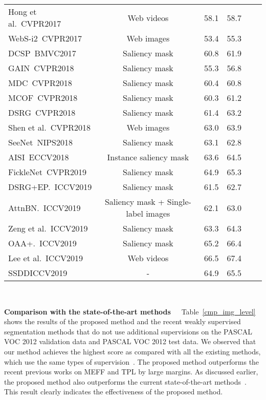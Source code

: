 \documentclass[10pt,twocolumn,letterpaper]{article}
\begin{document}
\begin{table}[tb]
\begin{center}
{\begin{tabular}{l|c|c|ccc}
       Hong et al.~\cite{webvideo-seg}\tiny{CVPR2017}  & Web videos  &  58.1   &   58.7\\
       WebS-i2~\cite{cvpr17web}\tiny{CVPR2017}      & Web images & 53.4 &55.3 \\
       DCSP~\cite{dcsp}\tiny{BMVC2017}      & Saliency mask & 60.8 &61.9 \\
       GAIN~\cite{gain}\tiny{CVPR2018}     & Saliency mask & 55.3 &56.8 \\
       MDC~\cite{mdc}\tiny{CVPR2018}      & Saliency mask & 60.4 & 60.8 \\
       MCOF~\cite{mcof}\tiny{CVPR2018}    & Saliency mask & 60.3 &61.2 \\
       DSRG~\cite{dsrg}\tiny{CVPR2018}   & Saliency mask & 61.4 &63.2 \\
       Shen et al.~\cite{cvpr18web}\tiny{CVPR2018}   & Web images  &  63.0 & 63.9 \\
       SeeNet~\cite{seenet}\tiny{NIPS2018}    & Saliency mask & 63.1 &62.8 \\
       AISI~\cite{salins}\tiny{ECCV2018}      & Instance saliency mask & 63.6 &64.5 \\
       FickleNet~\cite{ficklenet}\tiny{CVPR2019} & Saliency mask & 64.9 & 65.3 \\ 
       DSRG+EP.~\cite{DSRGEP}\tiny{ICCV2019} & Saliency mask & 61.5 & 62.7 \\ 
       AttnBN.~\cite{AttnBN}\tiny{ICCV2019} & Saliency mask + Single-label images & 62.1 & 63.0 \\
       Zeng et al.~\cite{zeng_iccv2019}\tiny{ICCV2019} & Saliency mask & 63.3 & 64.3 \\ 
       OAA+.~\cite{OAA}\tiny{ICCV2019} & Saliency mask & 65.2 & 66.4 \\ 
       Lee et al.~\cite{lee_iccv2019}\tiny{ICCV2019} & Web videos & 66.5 & 67.4 \\ \hline
       SSDD\tiny{ICCV2019}    & - &  64.9 &  65.5 \\
  \end{tabular}
}
\vskip -8mm~
  \end{center}
\end{table}


\noindent
{\bf Comparison with the state-of-the-art methods~~}
Table~\ref{cmp_img_level} shows the results of the proposed method and the recent weakly supervised segmentation methods that do not use additional supervisions on the PASCAL VOC 2012 validation data and PASCAL VOC 2012 test data.
We observed that our method achieves the highest score as compared with all the existing methods, 
which use the same types of supervision~\cite{Pathak15,papa15,dcsm,bfb,sec,tphase,cbts,meff,psa}.
The proposed method outperforms the recent previous works on MEFF and TPL by large margins.
As discussed earlier, the proposed method also outperforms the current state-of-the-art methods~\cite{psa}.
This result clearly indicates the effectiveness of the proposed method.
\end{document}
